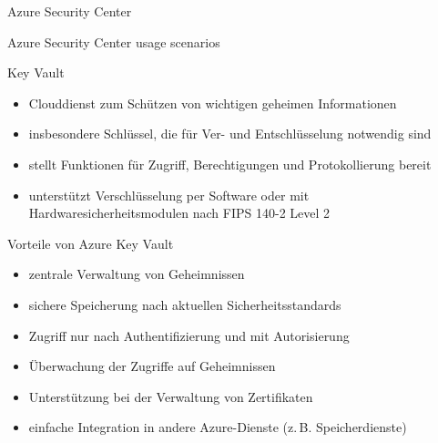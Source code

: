 \begin{flashcard}[Describe]{Azure Security Center}

\end{flashcard}

\begin{flashcard}[Understand]{Azure Security Center usage scenarios}

\end{flashcard}

\begin{flashcard}[Definition]{Key Vault}
    \begin{itemize}
        \item Clouddienst zum Schützen von wichtigen geheimen Informationen
        \item insbesondere Schlüssel, die für Ver- und Entschlüsselung notwendig sind
        \item stellt Funktionen für Zugriff, Berechtigungen und Protokollierung bereit
        \item unterstützt Verschlüsselung per Software oder mit Hardwaresicherheitsmodulen nach FIPS 140-2 Level 2
    \end{itemize}
\end{flashcard}

\begin{flashcard}[\ ]{Vorteile von Azure Key Vault}
    \begin{itemize}
        \item zentrale Verwaltung von Geheimnissen
        \item sichere Speicherung nach aktuellen Sicherheitsstandards
        \item Zugriff nur nach Authentifizierung und mit Autorisierung
        \item Überwachung der Zugriffe auf Geheimnissen
        \item Unterstützung bei der Verwaltung von Zertifikaten
        \item einfache Integration in andere Azure-Dienste (z.\,B. Speicherdienste)
    \end{itemize}

\end{flashcard}

